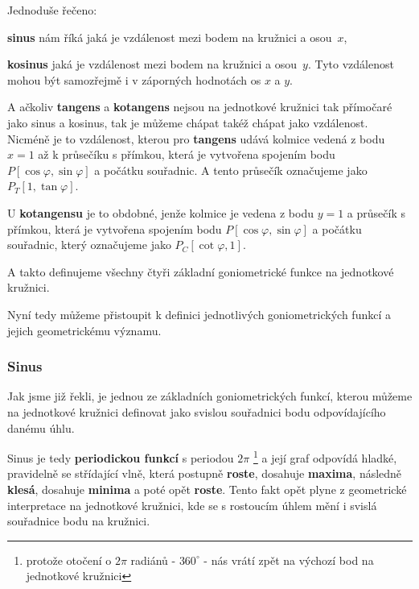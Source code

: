 \documentclass[12pt,a4paper]{article}
\begin{document}
\begin{notebox}
    Jednoduše řečeno:
    
    \textbf{sinus} nám říká jaká je vzdálenost mezi bodem na kružnici a osou~$x$,
    
    \textbf{kosinus} jaká je vzdálenost mezi bodem na kružnici a osou~$y$. Tyto vzdálenost mohou být samozřejmě i v záporných hodnotách os $x$ a $y$.
    
    
    A ačkoliv \textbf{tangens} a \textbf{kotangens} nejsou na jednotkové kružnici tak přímočaré jako sinus a kosinus,
    tak je můžeme chápat takéž chápat jako vzdálenost. Nicméně je to vzdálenost, kterou pro \textbf{tangens} udává kolmice vedená z bodu $x=1$ až k průsečíku s přímkou,
    která je vytvořena spojením bodu $P[\cos\varphi,\sin\varphi]$ a počátku souřadnic. A tento průsečík označujeme jako $P_T[1,\tan\varphi]$.

    U \textbf{kotangensu} je to obdobné, jenže kolmice je vedena z bodu $y=1$ a průsečík s přímkou, která je vytvořena spojením bodu $P[\cos\varphi,\sin\varphi]$ 
    a počátku souřadnic, který označujeme jako $P_C[\cot\varphi,1]$.

    A takto definujeme všechny čtyři základní goniometrické funkce na jednotkové kružnici.
\end{notebox}


Nyní tedy můžeme přistoupit k definici jednotlivých goniometrických funkcí a jejich geometrickému 
významu.

\subsubsection*{Sinus}

Jak jsme již řekli,  je jednou ze základních goniometrických funkcí, kterou můžeme
na jednotkové kružnici definovat jako svislou souřadnici bodu odpovídajícího danému úhlu.

Sinus je tedy \textbf{periodickou funkcí} s periodou \textbf{$2\pi$} \footnote{protože otočení o $2\pi$ radiánů - $360^\circ$ - nás vrátí zpět na výchozí bod na jednotkové kružnici} 
a její graf odpovídá hladké, pravidelně se střídající vlně, která postupně \textbf{roste}, dosahuje \textbf{maxima}, následně \textbf{klesá}, dosahuje \textbf{minima} a poté opět \textbf{roste}.
Tento fakt opět plyne z geometrické interpretace na jednotkové kružnici, kde se s rostoucím úhlem mění i svislá souřadnice bodu na kružnici.
\end{document}
